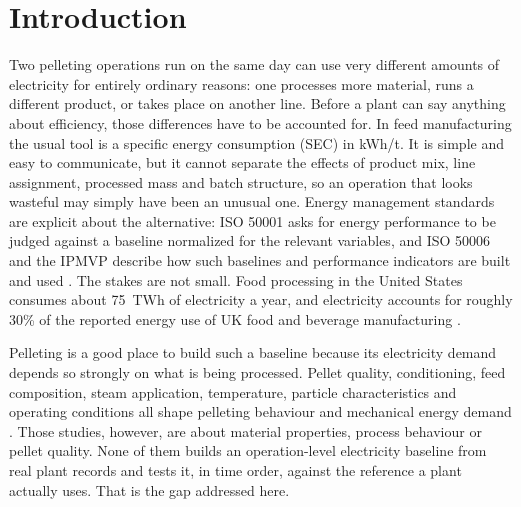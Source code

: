 \section{Introduction}\label{sec:introduction}
Two pelleting operations run on the same day can use very different amounts of electricity for entirely ordinary reasons: one processes more material, runs a different product, or takes place on another line. Before a plant can say anything about efficiency, those differences have to be accounted for. In feed manufacturing the usual tool is a specific energy consumption (SEC) in kWh/t. It is simple and easy to communicate, but it cannot separate the effects of product mix, line assignment, processed mass and batch structure, so an operation that looks wasteful may simply have been an unusual one. Energy management standards are explicit about the alternative: ISO 50001 asks for energy performance to be judged against a baseline normalized for the relevant variables, and ISO 50006 and the IPMVP describe how such baselines and performance indicators are built and used \citep{iso50001,iso50006,ipmvp2022}. The stakes are not small. Food processing in the United States consumes about 75~TWh of electricity a year, and electricity accounts for roughly 30\% of the reported energy use of UK food and beverage manufacturing \citep{compton2018,foster2023,park2021}.

Pelleting is a good place to build such a baseline because its electricity demand depends so strongly on what is being processed. Pellet quality, conditioning, feed composition, steam application, temperature, particle characteristics and operating conditions all shape pelleting behaviour and mechanical energy demand \citep{thomas1996,thomas1997,thomas2020,skoch1981,bastiaansen2023}. Those studies, however, are about material properties, process behaviour or pellet quality. None of them builds an operation-level electricity baseline from real plant records and tests it, in time order, against the reference a plant actually uses. That is the gap addressed here.

